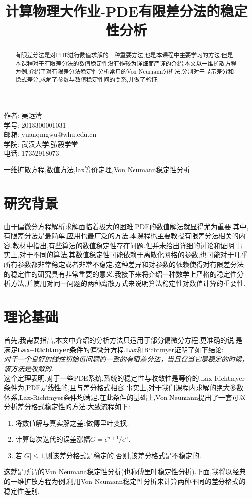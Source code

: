 \documentclass{article}
\title{计算物理大作业-PDE有限差分法的稳定性分析}
\author{}
\numberwithin{equation}{subsection}
\begin{document}
\maketitle
\begin{flushleft}
\large
作者: 吴远清\\
学号: 2018300001031\\
邮箱: yuanqingwu@whu.edu.cn\\
学院: 武汉大学,弘毅学堂\\
电话: 17352918073
\end{flushleft}
\clearpage
\begin{abstract}
    有限差分法是对PDE进行数值求解的一种重要方法,也是本课程中主要学习的方法.但是,本课程对于有限差分法的数值稳定性没有作较为详细而严谨的介绍.本文以一维扩散方程为例,介绍了对有限差分法稳定性分析常用的Von Neumann分析法,分别对于显示差分和隐式差分,求解了参数与数值稳定性间的关系,并做了验证.
\end{abstract}
\begin{keywords}
一维扩散方程,数值方法,lax等价定理,Von Neumann稳定性分析 
\end{keywords}
\section{研究背景}
由于偏微分方程解析求解面临着极大的困难,PDE的数值解法就显得尤为重要.其中,有限差分法是最简单,应用也最广泛的方法.本课程也主要教授有限差分法相关的内容.教材中指出,有些算法的数值稳定性存在问题\cite{giordano_computational_2006}.但并未给出详细的讨论和证明.事实上,对于不同的算法,其数值稳定性可能依赖于离散化网格的参数,也可能对于几乎所有参数都非常稳定或者非常不稳定\cite{thijssen_computational_2007}.这种差异和对参数的依赖使得对有限差分法的稳定性的研究具有非常重要的意义.我接下来将介绍一种数学上严格的稳定性分析方法,并使用对同一问题的两种离散方式来说明算法稳定性对数值计算的重要性.
\section{理论基础}
首先,我需要指出,本文中介绍的分析方法只适用于部分偏微分方程.更准确的说,是满足\textbf{Lax–Richtmyer条件}的偏微分方程.Lax和Richtmyer证明了如下结论\cite{lax_survey_1956}:\\
\emph{对于一个良好的线性初始值问题的一致的有限差分法，当且仅当它是稳定的时候，该方法是收敛的.}\\
这个定理表明,对于一些PDE系统,系统的稳定性与收敛性是等价的.Lax-Richtmyer条件为,PDE是线性的,且与差分格式相容.事实上,对于我们课程内求解的绝大多数体系,Lax-Richtmyer条件均满足.在此条件的基础上,Von Neumann提出了一套可以分析差分格式稳定性的方法\cite{charney_numerical_1950}.大致流程如下:
\begin{enumerate}[(1)]
    \item 将数值解与真实解之差$\epsilon$做傅里叶变换.
    \item 计算每次迭代的误差涨幅$G = \epsilon^{n+1}/\epsilon^n$.
    \item 若$|G|\leq 1$,则该差分格式是稳定的,否则,该差分格式是不稳定的.
\end{enumerate}
这就是所谓的Von Neumann稳定性分析(也称傅里叶稳定性分析).下面,我将以经典的一维扩散方程为例,利用Von Neumann稳定性分析来计算两种不同的差分格式的稳定性差别.
\end{document}
